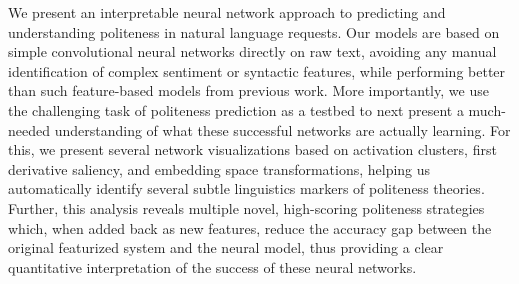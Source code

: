 We present an interpretable neural network approach to predicting and understanding politeness in natural language requests. Our models are based on simple convolutional neural networks directly on raw text, avoiding any manual identification of complex sentiment or syntactic features, while performing better than such feature-based models from previous work. More importantly, we use the challenging task of politeness prediction as a testbed to next present a much-needed understanding of what these successful networks are actually learning. For this, we present several network visualizations based on activation clusters, first derivative saliency, and embedding space transformations, helping us automatically identify several subtle linguistics markers of politeness theories. Further, this analysis reveals multiple novel, high-scoring politeness strategies which, when added back as new features, reduce the accuracy gap between the original featurized system and the neural model, thus providing a clear quantitative interpretation of the success of these neural networks.
